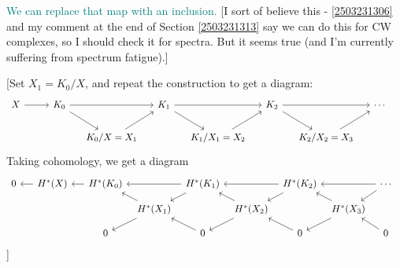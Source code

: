 \documentclass{MetricNotes2023}
\def\textcolour{\textcolor}
\begin{document}
\textcolour{teal}{We can replace that map with an inclusion.} [I sort of believe this - \ref{2503231306} and my comment at the end of Section \ref{2503231313} say we can do this for CW complexes, so I should check it for spectra. But it seems true (and I'm currently suffering from spectrum fatigue).]

[Set \(X_1=K_0/X\), and repeat the construction to get a diagram:
\begin{equation}\label{2503301114}
\begin{tikzcd}[column sep=3ex] 
 X \arrow[rr, ""]  & & K_0 \arrow[rr, ""] \arrow[dr, ""] & & K_1 \arrow[dr, ""] \arrow[rr, ""] & & K_2 \arrow[dr, ""] \arrow[rr, ""] & & \cdots \\ 
  &&& K_0/X=X_1 \arrow[ur, ""] & & K_1/X_1=X_2 \arrow[ur, ""] & & K_2/X_2=X_3 \arrow[ur, ""] &  &
 \end{tikzcd}\nonumber
\end{equation}
Taking cohomology, we get a diagram
\[\begin{tikzcd}[column sep=1.5ex, row sep = 2ex, arrows=<-]
 0 \arrow[rr, ""] && H^*(X) \arrow[rr,""] & & H^*(K_0) \arrow[rr, ""] \arrow[dr, ""] & & H^*(K_1) \arrow[dr, ""] \arrow[rr, ""] & & H^*(K_2) \arrow[dr, ""] \arrow[rr, ""] & & \cdots \\ 
  &&&&& H^*(X_1) \arrow[ur, ""] \arrow[dr] & & H^*(X_2) \arrow[ur, ""] \arrow[dr] & & H^*(X_3) \arrow[ur, ""] \arrow[dr] &  &\\
&&&& 0 \arrow[ur] && 0 \arrow[ur] && 0 \arrow[ur] && 0
 \end{tikzcd}\] 
]
\end{document}
